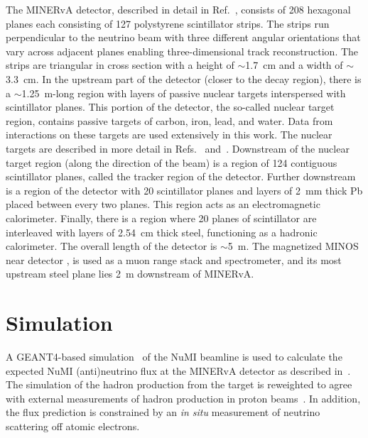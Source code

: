 \documentclass[aps,prd,twocolumn,showpacs,superscriptaddress,floatfix]{revtex4-2}  %
\begin{document}
The MINERvA detector, described in detail in Ref.~\cite{MINERvA:2013zvz}, consists of 208 hexagonal planes each consisting of 127 polystyrene scintillator strips.   The strips run perpendicular to the neutrino beam with three different angular orientations that vary across adjacent planes enabling three-dimensional track reconstruction. The strips are triangular in cross section with a height of $\sim$1.7~cm and a width of $\sim$3.3~cm.  In the upstream part of the detector (closer to the decay region), there is a $\sim$1.25~m-long region with layers of passive nuclear targets interspersed with scintillator planes.  This portion of the detector, the so-called nuclear target region, contains passive targets of carbon, iron, lead, and water.  Data from interactions on these targets are used extensively in this work. The nuclear targets are described in more detail in Refs.~\cite{MINERvA:2013zvz} and~\cite{jk_1trk_prl}.  Downstream of the nuclear target region (along the direction of the beam) is a region of 124 contiguous scintillator planes, called the tracker region of the detector.  Further downstream is a region of the detector with 20 scintillator planes and layers of 2~mm thick Pb placed between every two planes.  This region acts as an electromagnetic calorimeter.  Finally, there is a region where 20 planes of scintillator are interleaved with layers of 2.54~cm thick steel, functioning as a hadronic calorimeter.  The overall length of the detector %
is $\sim$5~m.  The magnetized MINOS near detector \cite{MINOS:2008hdf}, is used as a muon range stack and spectrometer, and its most upstream steel plane lies 2~m downstream of MINERvA.


\section{Simulation}
\label{sec:simulation}

A GEANT4-based simulation~\cite{GEANT4:2002zbu, *Allison:2006ve} of the NuMI beamline is used to calculate the expected NuMI (anti)neutrino flux at the MINERvA detector as described in~\cite{MINERvA:2016iqn, *fluxaddendum}.  The simulation of the hadron production from the target is reweighted to agree with external measurements of hadron production in proton beams~\cite{MIPP:2014shj, *NA49:2006oyk}. In addition, the flux prediction is constrained by an {\it in situ} measurement of neutrino scattering off atomic electrons\cite{MINERvA:2019mkf,MINERvA:2021mpk}.
\end{document}
